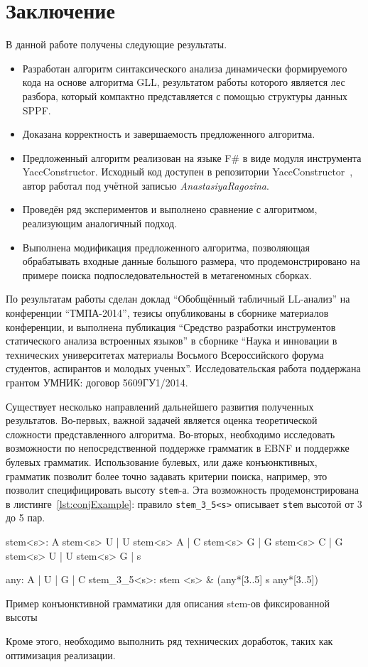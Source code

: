 \section*{Заключение}
В данной работе получены следующие результаты.
\begin{itemize}
\item Разработан алгоритм синтаксического анализа динамически  формируемого кода на основе алгоритма GLL, результатом работы которого является лес разбора, который компактно представляется с помощью структуры данных SPPF.
\item Доказана корректность и завершаемость предложенного алгоритма.
\item Предложенный алгоритм реализован на языке F\# в виде модуля инструмента YaccConstructor. Исходный код доступен в репозитории YaccConstructor~\cite{YCUrl}, автор работал под учётной записью \textit{AnastasiyaRagozina}.
\item Проведён ряд экспериментов и выполнено сравнение с алгоритмом, реализующим аналогичный подход.
\item Выполнена модификация предложенного алгоритма, позволяющая обрабатывать входные данные большого размера, что продемонстрировано на примере поиска подпоследовательностей в метагеномных сборках.
\end{itemize}

По результатам работы сделан доклад ``Обобщённый табличный LL-анализ'' на конференции ``ТМПА-2014'', тезисы опубликованы в сборнике материалов конференции,  и выполнена  публикация ``Средство разработки инструментов статического анализа встроенных языков'' в сборнике ``Наука и инновации в технических университетах материалы Восьмого Всероссийского форума студентов, аспирантов и молодых ученых''. Исследовательская работа поддержана грантом УМНИК: договор \textnumero 5609ГУ1/2014.

Существует несколько направлений дальнейшего развития полученных результатов. Во-первых, важной задачей является оценка теоретической сложности представленного алгоритма. Во-вторых, необходимо исследовать возможности по непосредственной поддержке грамматик в EBNF и поддержке булевых грамматик. Использование булевых, или даже конъюнктивных, грамматик позволит более точно задавать критерии поиска, например, это позволит специфицировать высоту \texttt{stem}-а. Эта возможность продемонстрирована в листинге~\ref{lst:conjExample}: правило \verb|stem_3_5<s>| описывает \texttt{stem} высотой от 3 до 5 пар.

\begin{listing}
    \begin{pyglist}[language=ocaml,numbers=left,numbersep=5pt]

stem<s>: 
      A stem<s> U
    | U stem<s> A
    | C stem<s> G
    | G stem<s> C
    | G stem<s> U
    | U stem<s> G
    | s

any: A | U | G | C
stem_3_5<s>: stem <s> & (any*[3..5] s any*[3..5])

\end{pyglist}
\caption{Пример конъюнктивной грамматики для описания stem-ов фиксированной высоты}
\label{lst:conjExample}
\end{listing}


Кроме этого, необходимо выполнить ряд технических доработок, таких как оптимизация реализации.
